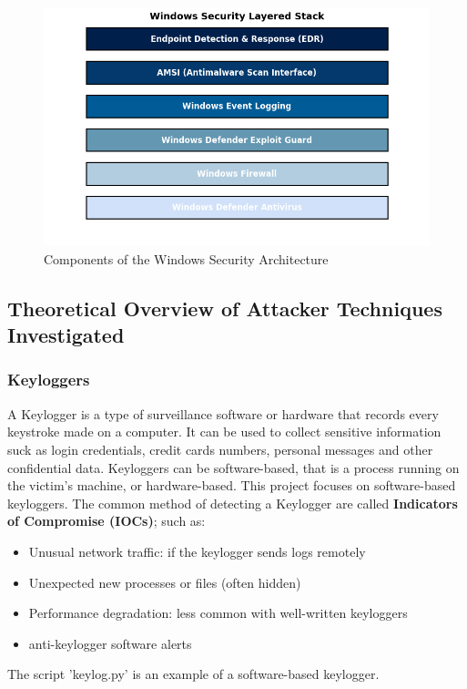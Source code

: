 \documentclass[11pt]{article}
\begin{document}
				\begin{figure}[H]
					\centering
					\includegraphics[width=\linewidth]{Pictures/windowssecuritylayer}
					\caption{Components of the Windows Security Architecture}
					\label{fig:windowssecuritylayer}
				\end{figure}
				
				
			\subsection{Theoretical Overview of Attacker Techniques Investigated}
				\subsubsection{Keyloggers}
					A Keylogger is a type of surveillance software or hardware that records every keystroke made on a computer. It can be used to collect sensitive information suck as login credentials, credit cards numbers, personal messages and other confidential data. Keyloggers can be software-based, that is a process running on the victim's machine, or hardware-based. This project focuses on software-based keyloggers.
					The common method of detecting a Keylogger are called \textbf{Indicators of Compromise (IOCs)}; such as:
					\begin{itemize}
						\item Unusual network traffic: if the keylogger sends logs remotely
						\item Unexpected new processes or files (often hidden)
						\item Performance degradation: less common with well-written keyloggers
						\item anti-keylogger software alerts
					\end{itemize}
					The script 'keylog.py' is an example of a software-based keylogger.
					
\end{document}
